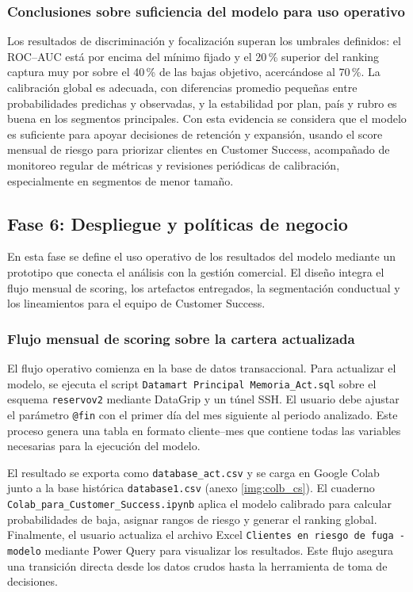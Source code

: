 \subsubsection{Conclusiones sobre suficiencia del modelo para uso operativo}

Los resultados de discriminación y focalización superan los umbrales definidos: el ROC–AUC está por encima del mínimo fijado y el 20\,\% superior del ranking captura muy por sobre el 40\,\% de las bajas objetivo, acercándose al 70\,\%. La calibración global es adecuada, con diferencias promedio pequeñas entre probabilidades predichas y observadas, y la estabilidad por plan, país y rubro es buena en los segmentos principales. Con esta evidencia se considera que el modelo es suficiente para apoyar decisiones de retención y expansión, usando el score mensual de riesgo para priorizar clientes en Customer Success, acompañado de monitoreo regular de métricas y revisiones periódicas de calibración, especialmente en segmentos de menor tamaño.

\subsection{Fase 6: Despliegue y políticas de negocio}

En esta fase se define el uso operativo de los resultados del modelo mediante un prototipo que conecta el análisis con la gestión comercial. El diseño integra el flujo mensual de scoring, los artefactos entregados, la segmentación conductual y los lineamientos para el equipo de Customer Success.

\subsubsection{Flujo mensual de scoring sobre la cartera actualizada}

El flujo operativo comienza en la base de datos transaccional. Para actualizar el modelo, se ejecuta el script \texttt{Datamart Principal Memoria\_Act.sql} sobre el esquema \texttt{reservov2} mediante DataGrip y un túnel SSH. El usuario debe ajustar el parámetro \texttt{@fin} con el primer día del mes siguiente al periodo analizado. Este proceso genera una tabla en formato cliente–mes que contiene todas las variables necesarias para la ejecución del modelo.

El resultado se exporta como \texttt{database\_act.csv} y se carga en Google Colab junto a la base histórica \texttt{database1.csv} (anexo \ref{img:colb_cs}). El cuaderno \texttt{Colab\_para\_Customer\_Success.ipynb} aplica el modelo calibrado para calcular probabilidades de baja, asignar rangos de riesgo y generar el ranking global. Finalmente, el usuario actualiza el archivo Excel \texttt{Clientes en riesgo de fuga - modelo} mediante Power Query para visualizar los resultados. Este flujo asegura una transición directa desde los datos crudos hasta la herramienta de toma de decisiones.

